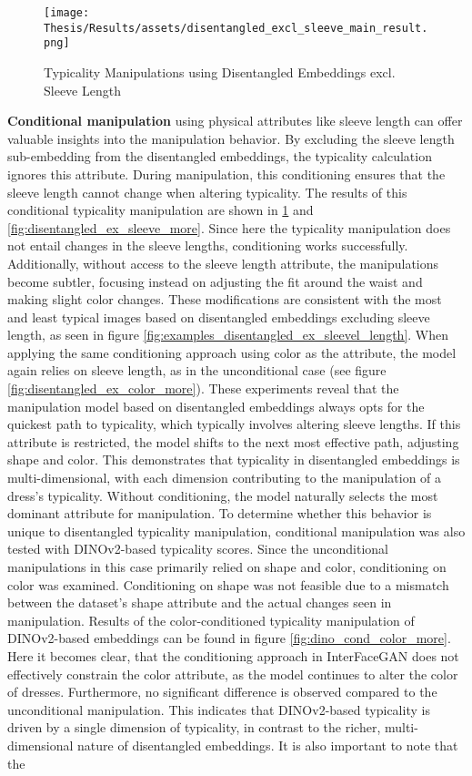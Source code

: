 \begin{figure}[!ht]
    \centering
    \texttt{[image: Thesis/Results/assets/disentangled\_excl\_sleeve\_main\_result.png]}
    \caption[Typicality Manipulations using Disentangled Embeddings excl. sleeve length]{Typicality Manipulations using Disentangled Embeddings excl. Sleeve Length}
    \label{fig:disentangled_excl_sleeve_main_result}
\end{figure}
\textbf{Conditional manipulation} using physical attributes like sleeve length can offer valuable insights into the manipulation behavior. By excluding the sleeve length sub-embedding from the disentangled embeddings, the typicality calculation ignores this attribute. During manipulation, this conditioning ensures that the sleeve length cannot change when altering typicality. The results of this conditional typicality manipulation are shown in \ref{fig:disentangled_excl_sleeve_main_result} and \ref{fig:disentangled_ex_sleeve_more}. Since here the typicality manipulation does not entail changes in the sleeve lengths, conditioning works successfully. Additionally, without access to the sleeve length attribute, the manipulations become subtler, focusing instead on adjusting the fit around the waist and making slight color changes. These modifications are consistent with the most and least typical images based on disentangled embeddings excluding sleeve length, as seen in figure \ref{fig:examples_disentangled_ex_sleevel_length}. When applying the same conditioning approach using color as the attribute, the model again relies on sleeve length, as in the unconditional case (see figure \ref{fig:disentangled_ex_color_more}). These experiments reveal that the manipulation model based on disentangled embeddings always opts for the quickest path to typicality, which typically involves altering sleeve lengths. If this attribute is restricted, the model shifts to the next most effective path, adjusting shape and color. This demonstrates that typicality in disentangled embeddings is multi-dimensional, with each dimension contributing to the manipulation of a dress's typicality. Without conditioning, the model naturally selects the most dominant attribute for manipulation. To determine whether this behavior is unique to disentangled typicality manipulation, conditional manipulation was also tested with DINOv2-based typicality scores. Since the unconditional manipulations in this case primarily relied on shape and color, conditioning on color was examined. Conditioning on shape was not feasible due to a mismatch between the dataset's shape attribute and the actual changes seen in manipulation. Results of the color-conditioned typicality manipulation of DINOv2-based embeddings can be found in figure \ref{fig:dino_cond_color_more}. Here it becomes clear, that the conditioning approach in InterFaceGAN does not effectively constrain the color attribute, as the model continues to alter the color of dresses. Furthermore, no significant difference is observed compared to the unconditional manipulation. This indicates that DINOv2-based typicality is driven by a single dimension of typicality, in contrast to the richer, multi-dimensional nature of disentangled embeddings. It is also important to note that the 